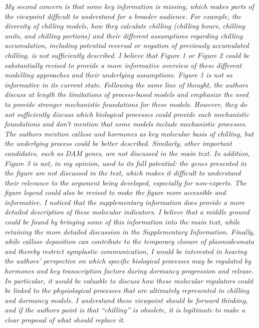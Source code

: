 \documentclass[11pt]{article}
\begin{document}
\emph{My second concern is that some key information is missing, which makes parts of the viewpoint difficult to understand for a broader audience. For example, the diversity of chilling models, how they calculate chilling (chilling hours, chilling units, and chilling portions) and their different assumptions regarding chilling accumulation, including potential reversal or negation of previously accumulated chilling, is not sufficiently described. I believe that Figure 1 or Figure 2 could be substantially revised to provide a more informative overview of these different modelling approaches and their underlying assumptions. Figure 1 is not so informative in its current state. Following the same line of thought, the authors discuss at length the limitations of process-based models and emphasize the need to provide stronger mechanistic foundations for these models. However, they do not sufficiently discuss which biological processes could provide such mechanistic foundations and don’t mention that some models include mechanistic processes. The authors mention callose and hormones as key molecular basis of chilling, but the underlying process could be better described. Similarly, other important candidates, such as DAM genes, are not discussed in the main text. In addition, Figure 3 is not, in my opinion, used to its full potential: the genes presented in the figure are not discussed in the text, which makes it difficult to understand their relevance to the argument being developed, especially for non-experts. The figure legend could also be revised to make the figure more accessible and informative. I noticed that the supplementary information does provide a more detailed description of these molecular indicators. I believe that a middle ground could be found by bringing some of this information into the main text, while retaining the more detailed discussion in the Supplementary Information. Finally, while callose deposition can contribute to the temporary closure of plasmodesmata and thereby restrict symplastic communication, I would be interested in hearing the authors' perspective on which specific biological processes may be regulated by hormones and key transcription factors during dormancy progression and release. In particular, it would be valuable to discuss how these molecular regulators could be linked to the physiological processes that are ultimately represented in chilling and dormancy models. I understand these viewpoint should be forward thinking, and if the authors point is that “chilling” is obsolete, it is legitimate to make a clear proposal of what should replace it.} 
\end{document}
